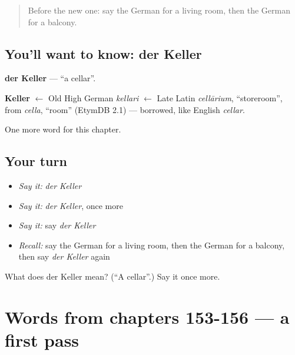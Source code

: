 \label{lesson:GE-C161-keller}



\begin{quote}
Before the new one: say the German for a living room, then the German for a balcony.
\end{quote}

\subsection*{You'll want to know: der Keller}
\textbf{der Keller} — \textquotedblleft{}a cellar\textquotedblright{}.

\begin{cousinweb}
\textbf{Keller} $\leftarrow$ Old High German \emph{kellari} $\leftarrow$ Late Latin \emph{cellārium}, \textquotedblleft{}storeroom\textquotedblright{}, from \emph{cella}, \textquotedblleft{}room\textquotedblright{} (EtymDB 2.1) — borrowed, like English \emph{cellar}.
\end{cousinweb}

\begin{grammarlens}[title={What you've built}]
One more word for this chapter.
\end{grammarlens}

\subsection*{Your turn}
\begin{itemize}
\raggedright
  \item \emph{Say it:} \emph{der Keller}
  \item \emph{Say it:} \emph{der Keller}, once more
  \item \emph{Say it:} say \emph{der Keller}
  \item \emph{Recall:} say the German for a living room, then the German for a balcony, then say \emph{der Keller} again
\end{itemize}

\begin{tcolorbox}[breakable,colback=teal!4,colframe=teal!35!black,title={Before you move on}]
What does der Keller mean? (\textquotedblleft{}A cellar\textquotedblright{}.) Say it once more.
\end{tcolorbox}
\section[(dialogue)]{Words from chapters 153-156 — a first pass}

